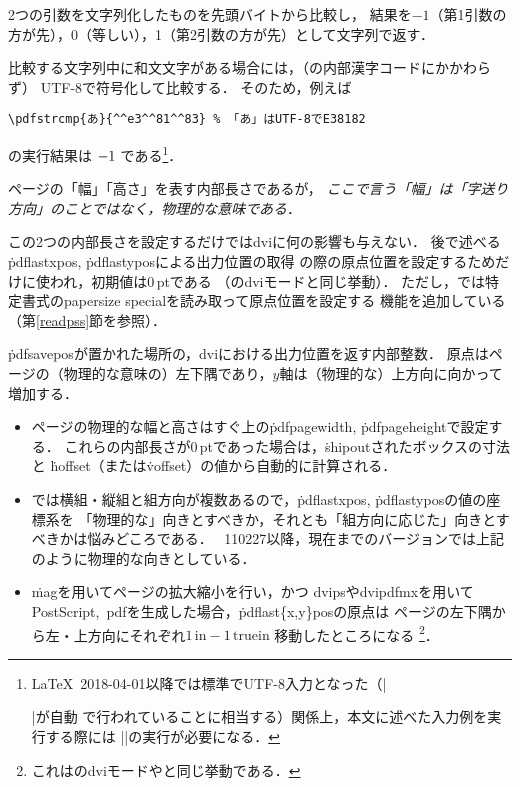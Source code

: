 \documentclass[a4paper,11pt,nomag,dvipdfmx]{jsarticle}
\begin{document}
\begin{cslist}
  2つの引数を文字列化したものを先頭バイトから比較し，
  結果を$-1$（第1引数の方が先），0（等しい），1（第2引数の方が先）として文字列で返す．

  比較する文字列中に和文文字がある場合には，（\epTeX の内部漢字コードにかかわらず）
  UTF-8で符号化して比較する．
  そのため，例えば
\begin{verbatim}
\pdfstrcmp{あ}{^^e3^^81^^83} % 「あ」はUTF-8でE38182
\end{verbatim}
  の実行結果は
    {\ifdefined\UseRawInputEncoding\UseRawInputEncoding\fi
    $\pdfstrcmp{あ}{^^e3^^81^^83}$}%
  である\footnote{%
    \LaTeX~2018-04-01以降では標準でUTF-8入力となった（|\usepackage[utf8]{inputenc}|が自動
    で行われていることに相当する）関係上，本文に述べた入力例を実行する際には
    |\UseRawInputEncoding|の実行が必要になる．
  }．

  ページの「幅」「高さ」を表す内部長さであるが，
  \emph{ここで言う「幅」は「字送り方向」のことではなく，物理的な意味である}．

  この2つの内部長さを設定するだけではdviに何の影響も与えない．
  後で述べる\.{pdflastxpos}, \.{pdflastypos}による出力位置の取得
  の際の原点位置を設定するためだけに使われ，初期値は0\,ptである
  （のdviモードと同じ挙動）．
  ただし，\epTeX では特定書式のpapersize specialを読み取って原点位置を設定する
  機能を追加している（第\ref{readpss}節を参照）．

 \label{pdfsavepos}
  \.{pdfsavepos}が置かれた場所の，dviにおける出力位置を返す内部整数．
  原点はページの（物理的な意味の）左下隅であり，$y$軸は（物理的な）上方向に向かって増加する．
 \begin{itemize}
  \item ページの物理的な幅と高さはすぐ上の\.{pdfpagewidth}, \.{pdfpageheight}で設定する．
    これらの内部長さが0\,ptであった場合は，\.{shipout}されたボックスの寸法と
    \.{hoffset}（または\.{voffset}）の値から自動的に計算される．
  \item \pTeX では横組・縦組と組方向が複数あるので，\.{pdflastxpos}, \.{pdflastypos}の値の座標系を
    「物理的な」向きとすべきか，それとも「組方向に応じた」向きとすべきかは悩みどころである．
    \epTeX~110227以降，現在までのバージョンでは上記のように物理的な向きとしている．
  \item \.{mag}を用いてページの拡大縮小を行い，かつ
    dvipsやdvipdfmxを用いてPostScript,~pdfを生成した場合，\.{pdflast\{x,y\}pos}の原点は
    ページの左下隅から左・上方向にそれぞれ$1\,\mathrm{in}-1\,\mathrm{truein}$%
    移動したところになる
    \footnote{これはのdviモードやと同じ挙動である．}．
 \end{itemize}


\end{cslist}
\end{document}
